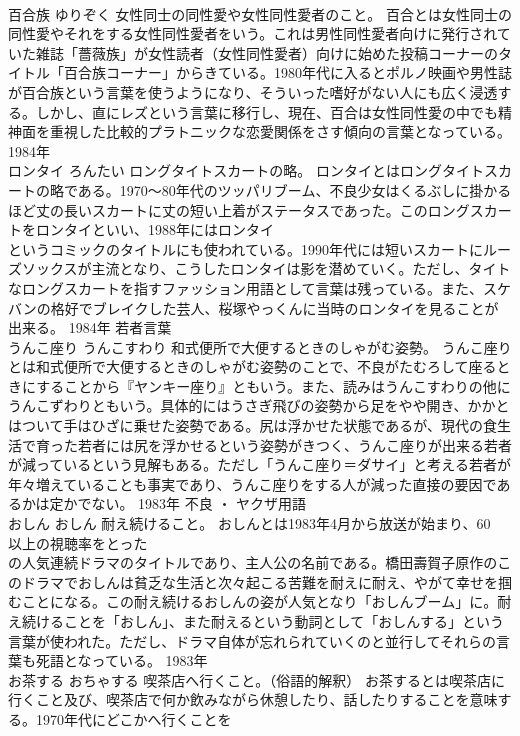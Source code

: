 \documentclass[8pt]{extreport}
\begin{document}
\begin{CJK}{UTF8}{min}
\\	百合族	ゆりぞく	女性同士の同性愛や女性同性愛者のこと。	百合とは女性同士の同性愛やそれをする女性同性愛者をいう。これは男性同性愛者向けに発行されていた雑誌「薔薇族」が女性読者（女性同性愛者）向けに始めた投稿コーナーのタイトル「百合族コーナー」からきている。1980年代に入るとポルノ映画や男性誌が百合族という言葉を使うようになり、そういった嗜好がない人にも広く浸透する。しかし、直にレズという言葉に移行し、現在、百合は女性同性愛の中でも精神面を重視した比較的プラトニックな恋愛関係をさす傾向の言葉となっている。	1984年	
\\	ロンタイ	ろんたい	ロングタイトスカートの略。	ロンタイとはロングタイトスカートの略である。1970～80年代のツッパリブーム、不良少女はくるぶしに掛かるほど丈の長いスカートに丈の短い上着がステータスであった。このロングスカートをロンタイといい、1988年にはロンタイ
\\	というコミックのタイトルにも使われている。1990年代には短いスカートにルーズソックスが主流となり、こうしたロンタイは影を潜めていく。ただし、タイトなロングスカートを指すファッション用語として言葉は残っている。また、スケバンの格好でブレイクした芸人、桜塚やっくんに当時のロンタイを見ることが出来る。	1984年	若者言葉	
\\	うんこ座り	うんこすわり	和式便所で大便するときのしゃがむ姿勢。	うんこ座りとは和式便所で大便するときのしゃがむ姿勢のことで、不良がたむろして座るときにすることから『ヤンキー座り』ともいう。また、読みはうんこすわりの他にうんこずわりともいう。具体的にはうさぎ飛びの姿勢から足をやや開き、かかとはついて手はひざに乗せた姿勢である。尻は浮かせた状態であるが、現代の食生活で育った若者には尻を浮かせるという姿勢がきつく、うんこ座りが出来る若者が減っているという見解もある。ただし「うんこ座り＝ダサイ」と考える若者が年々増えていることも事実であり、うんこ座りをする人が減った直接の要因であるかは定かでない。	1983年	不良 ・ ヤクザ用語	
\\	おしん	おしん	耐え続けること。	おしんとは1983年4月から放送が始まり、60
\\	以上の視聴率をとった
\\	の人気連続ドラマのタイトルであり、主人公の名前である。橋田壽賀子原作のこのドラマでおしんは貧乏な生活と次々起こる苦難を耐えに耐え、やがて幸せを掴むことになる。この耐え続けるおしんの姿が人気となり「おしんブーム」に。耐え続けることを「おしん」、また耐えるという動詞として「おしんする」という言葉が使われた。ただし、ドラマ自体が忘れられていくのと並行してそれらの言葉も死語となっている。	1983年	
\\	お茶する	おちゃする	喫茶店へ行くこと。（俗語的解釈）	お茶するとは喫茶店に行くこと及び、喫茶店で何か飲みながら休憩したり、話したりすることを意味する。1970年代にどこかへ行くことを

\end{CJK}
\end{document}

